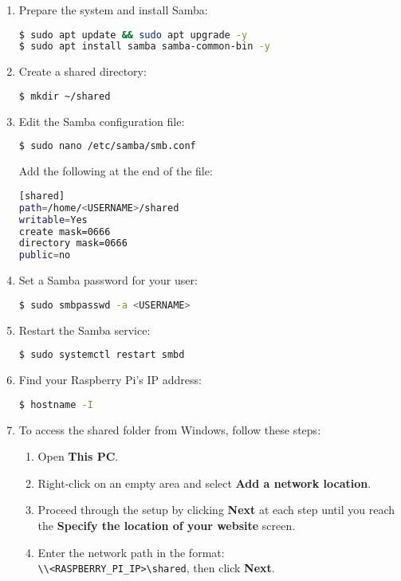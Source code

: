 \begin{enumerate}
\item Prepare the system and install Samba:
\begin{lstlisting}[language=bash, breaklines=true, breakatwhitespace=true, columns=fullflexible]
$ sudo apt update && sudo apt upgrade -y
$ sudo apt install samba samba-common-bin -y
\end{lstlisting}

\item Create a shared directory:
\begin{lstlisting}[language=bash, breaklines=true, breakatwhitespace=true, columns=fullflexible]
$ mkdir ~/shared
\end{lstlisting}

\item Edit the Samba configuration file:
\begin{lstlisting}[language=bash, breaklines=true, breakatwhitespace=true, columns=fullflexible]
$ sudo nano /etc/samba/smb.conf
\end{lstlisting}
Add the following at the end of the file:
\begin{lstlisting}[language=bash, breaklines=true, breakatwhitespace=true, columns=fullflexible]
[shared]
path=/home/<USERNAME>/shared
writable=Yes
create mask=0666
directory mask=0666
public=no
\end{lstlisting}

\item Set a Samba password for your user:
\begin{lstlisting}[language=bash, breaklines=true, breakatwhitespace=true, columns=fullflexible]
$ sudo smbpasswd -a <USERNAME>
\end{lstlisting}

\item Restart the Samba service:
\begin{lstlisting}[language=bash, breaklines=true, breakatwhitespace=true, columns=fullflexible]
$ sudo systemctl restart smbd
\end{lstlisting}

\item Find your Raspberry Pi's IP address:
\begin{lstlisting}[language=bash, breaklines=true, breakatwhitespace=true, columns=fullflexible]
$ hostname -I
\end{lstlisting}

\item To access the shared folder from Windows, follow these steps:
\begin{enumerate}
\item Open \textbf{This PC}.
\item Right-click on an empty area and select \textbf{Add a network location}.
\item Proceed through the setup by clicking \textbf{Next} at each step until you reach the \textbf{Specify the location of your website} screen.
\item Enter the network path in the format: \texttt{\\\textbackslash\textbackslash<RASPBERRY\_PI\_IP>\textbackslash shared}, then click \textbf{Next}.
\end{enumerate}


\end{enumerate}